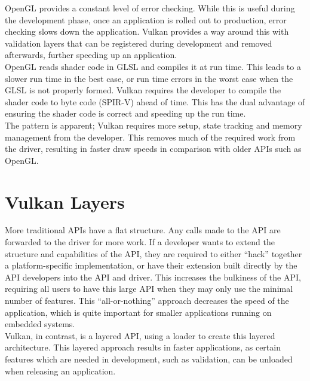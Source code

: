 \documentclass[12pt]{report}
\theoremstyle{definition}
\begin{document}
      OpenGL provides a constant level of error checking. While this is useful
      during the development phase, once an application is rolled out to
      production, error checking slows down the application. Vulkan provides
      a way around this with validation layers that can be registered during
      development and removed afterwards, further speeding up an application. \\

      OpenGL reads shader code in GLSL and compiles it at run time. This leads
      to a slower run time in the best case, or run time errors in the worst
      case when the GLSL is not properly formed. Vulkan requires the developer
      to compile the shader code to byte code (SPIR-V) ahead of time. 
      This has the dual advantage of ensuring the shader
      code is correct and speeding up the run time. \\

      The pattern is apparent; Vulkan requires more setup, state tracking and
      memory management from the developer. This removes much of the required
      work from the driver, resulting in faster draw speeds in comparison
      with older APIs such as OpenGL.

    \section{Vulkan Layers}

      More traditional APIs have a flat structure. Any calls made to the API are
      forwarded to the driver for more work. If a developer wants to extend the
      structure and capabilities of the API, they are required to either ``hack''
      together a platform-specific implementation, or have their extension
      built directly by the API developers into the API and driver. This
      increases the bulkiness of the API, requiring all users to have
      this large API when they may only use the minimal number of features.
      This ``all-or-nothing'' approach decreases the speed of the application,
      which is quite important for smaller applications running on embedded
      systems. \\

      Vulkan, in contrast, is a layered API, using a loader to create this
      layered architecture. This layered approach results in faster
      applications, as certain features which are needed in development,
      such as validation, can be unloaded when releasing an application.
\end{document}
